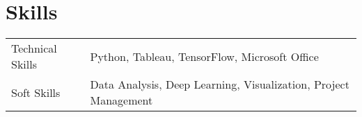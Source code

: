 \documentclass[a4paper,12pt]{article}
\begin{document}
\section{Skills}
\begin{tabularx}{\linewidth}{@{}l X@{}}
Technical Skills & Python, Tableau, TensorFlow, Microsoft Office \\
Soft Skills & Data Analysis, Deep Learning, Visualization, Project Management \\
\end{tabularx}

\vfill
{}
\end{document}
